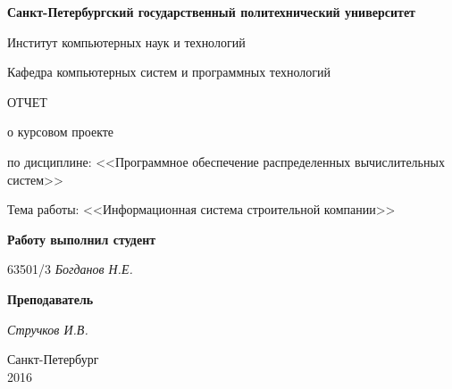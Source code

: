 \begin{titlepage}
\begin{center}

\textbf{Санкт-Петербургский государственный политехнический университет}

\vspace{5mm}
Институт компьютерных наук и технологий

\vspace{5mm}
Кафедра компьютерных систем и программных технологий

\vspace*{\fill}

\huge{ОТЧЕТ}

\Large{о курсовом проекте}
\vspace{2mm}

\large{по дисциплине: <<Программное обеспечение распределенных вычислительных систем>>}

\vspace*{2mm}
\large{Тема работы: <<Информационная система строительной компании>>}

\vspace*{\fill}
\end{center}

\begin{large}
\hspace{0.4\linewidth} \textbf{Работу выполнил студент}

\vspace{5mm}
\hspace{0.4\linewidth} 63501/3 \hspace{5mm} \textit{Богданов Н.Е.}

\vspace{3mm}
\hspace{0.4\linewidth} \textbf{Преподаватель}

\vspace{5mm}
\hspace{0.4\linewidth} \underline{\hspace{2cm} } \hspace{3mm} \textit{Стручков И.В.}
\end{large}

\vspace*{3cm}

\begin{center}
\normalsize Санкт-Петербург\\2016
\end{center}
\end{titlepage}